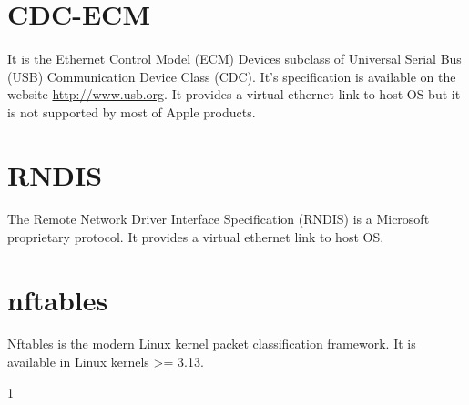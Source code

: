 \documentclass[mscthesis]{usiinfthesis}
\begin{document}
\section{CDC-ECM}\label{sec:CDC-ECM}
\paragraph{}
It is the Ethernet Control Model (ECM) Devices subclass of Universal Serial Bus (USB) Communication Device Class (CDC). It's specification is available on the website \url{http://www.usb.org}. It provides a virtual ethernet link to host OS but it is not supported by most of Apple products.

\section{RNDIS}\label{sec:RNDIS}
\paragraph{}
The Remote Network Driver Interface Specification (RNDIS) is a Microsoft proprietary protocol. It provides a virtual ethernet link to host OS.

\section{nftables}\label{sec:nftables}
\paragraph{}
Nftables is the modern Linux kernel packet classification framework. It is available in Linux kernels >= 3.13.
%
%



1
\end{document}
